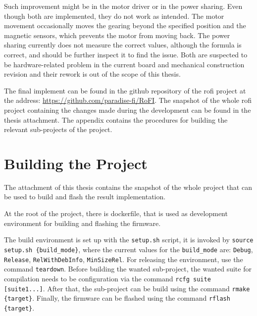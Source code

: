 \documentclass[
  digital,     %
  oneside,     %
  nosansbold,  %
  nocolorbold, %
  nolof,         %
  nolot,         %
]{fithesis4}
\newcommand{\TODO}[1]{\textcolor{red}{\textit{#1}}}
\newcommand{\TODOLIST}[1]{}
\begin{document}
{{{Such improvement might be in the motor driver or in the power sharing. Even though both are implemented, they do not work as intended. The motor movement occasionally moves the gearing beyond the specified position and the magnetic sensors, which prevents the motor from moving back. The power sharing currently does not measure the correct values, although the formula is correct, and should be further inspect it to find the issue. Both are suspected to be hardware-related problem in the current board and mechanical construction revision and their rework is out of the scope of this thesis.

The final implement can be found in the github repository of the \acrshort{rofi} project at the address: \url{https://github.com/paradise-fi/RoFI}. The snapshot of the whole \acrshort{rofi} project containing the changes made during the development can be found in the thesis attachment. The appendix contains the procedures for building the relevant sub-projects of the project.

\appendix %
\chapter{Building the Project}

\TODOLIST{
\begin{itemize}
    \item Setup project --- dev env = docker
    \item source setup.sh $\rightarrow$ compile roficom, compile hal example
    \item flashing roficom
    \item flashing esp32
\end{itemize}
}

The attachment of this thesis contains the snapshot of the whole project that can be used to build and flash the result implementation.

At the root of the project, there is dockerfile, that is used as development environment for building and flashing the firmware.

The build environment is set up with the \texttt{setup.sh} script, it is invoked by \texttt{source setup.sh \{build\_mode\}}, where the current values for the \texttt{build\_mode} are: \texttt{Debug}, \texttt{Release}, \texttt{RelWithDebInfo}, \texttt{MinSizeRel}. For releasing the environment, use the command \texttt{teardown}. Before building the wanted sub-project, the wanted suite for compilation needs to be configuration via the command \texttt{rcfg suite [suite1...]}. After that, the sub-project can be build using the command \texttt{rmake \{target\}}. Finally, the firmware can be flashed using the command \texttt{rflash \{target\}}.

}}}
\end{document}
